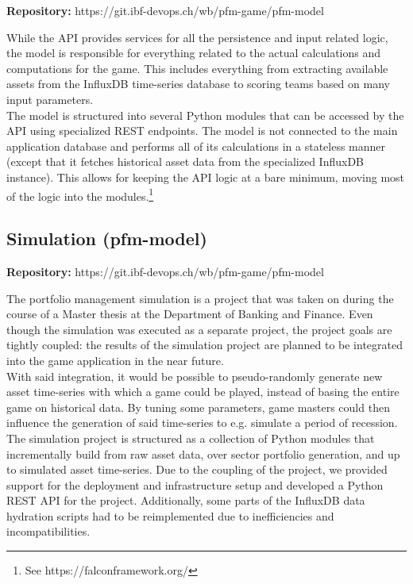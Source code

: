 \begin{flushright}
  \textbf{Repository:} https://git.ibf-devops.ch/wb/pfm-game/pfm-model
\end{flushright}

While the API provides services for all the persistence and input related logic, the model is responsible for everything related to the actual calculations and computations for the game. This includes everything from extracting available assets from the InfluxDB time-series database to scoring teams based on many input parameters.\\

The model is structured into several Python modules that can be accessed by the API using specialized REST endpoints. The model is not connected to the main application database and performs all of its calculations in a stateless manner (except that it fetches historical asset data from the specialized InfluxDB instance). This allows for keeping the API logic at a bare minimum, moving most of the logic into the modules.\footnote{See https://falconframework.org/}


\subsection{Simulation (pfm-model)}

\begin{flushright}
  \textbf{Repository:} https://git.ibf-devops.ch/wb/pfm-game/pfm-model
\end{flushright}

The portfolio management simulation is a project that was taken on during the course of a Master thesis at the Department of Banking and Finance. Even though the simulation was executed as a separate project, the project goals are tightly coupled: the results of the simulation project are planned to be integrated into the game application in the near future.\\

With said integration, it would be possible to pseudo-randomly generate new asset time-series with which a game could be played, instead of basing the entire game on historical data. By tuning some parameters, game masters could then influence the generation of said time-series to e.g. simulate a period of recession.\\

The simulation project is structured as a collection of Python modules that incrementally build from raw asset data, over sector portfolio generation, and up to simulated asset time-series. Due to the coupling of the project, we provided support for the deployment and infrastructure setup and developed a Python REST API for the project. Additionally, some parts of the InfluxDB data hydration scripts had to be reimplemented due to inefficiencies and incompatibilities.\\

